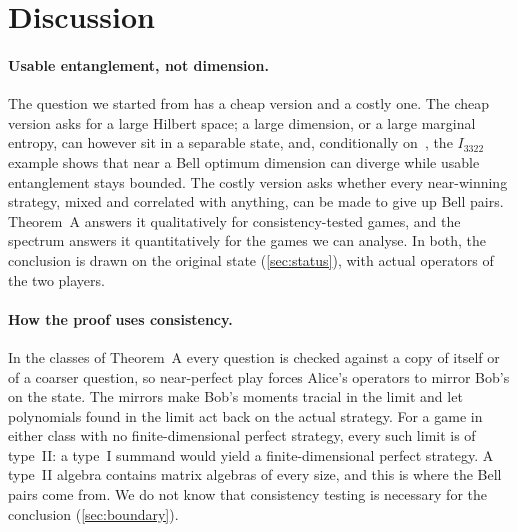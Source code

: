 \section{Discussion}\label{sec:discussion}

\paragraph{Usable entanglement, not dimension.} The question we started from has a cheap version and a costly one. The cheap
version asks for a large Hilbert space; a large dimension, or a large marginal entropy, can however sit in a separable state,
and, conditionally on~\cite{Dou26}, the $I_{3322}$ example shows that near a Bell optimum dimension can diverge while usable
entanglement stays bounded. The costly version asks
whether every near-winning strategy, mixed and correlated with anything, can be made to give up Bell pairs. Theorem~A answers it
qualitatively for consistency-tested games, and the spectrum answers it quantitatively for the games we can analyse. In both,
the conclusion is drawn on the original state (\cref{sec:status}), with actual operators of the two players.

\paragraph{How the proof uses consistency.} In the classes of Theorem~A every question is checked against a copy of itself or of
a coarser question, so near-perfect play forces Alice's operators to mirror Bob's on the state. The mirrors make Bob's moments
tracial in the limit and let polynomials found in the limit act back on the actual strategy. For a game in either class with no
finite-dimensional perfect strategy, every such limit is of type~II: a type~I summand would yield a finite-dimensional perfect
strategy. A type~II algebra contains matrix algebras of every size, and this is where the Bell pairs come from. We do not know
that consistency testing is necessary for the conclusion (\cref{sec:boundary}).

